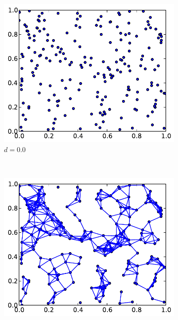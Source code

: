 \begin{figure}[H]
  \centering
  \begin{subfigure}[b]{0.45\textwidth}
    \centering
    \includegraphics[scale=0.65]{../code/final_results/geometric_graphs/geo1.pdf}
    \caption{$d = 0.0$}
    \label{fig:geo1}  
  \end{subfigure}
  ~ %
  \begin{subfigure}[b]{0.45\textwidth}
    \centering
    \includegraphics[scale=0.65]{../code/final_results/geometric_graphs/geo2.pdf}

\end{subfigure}
\end{figure}
